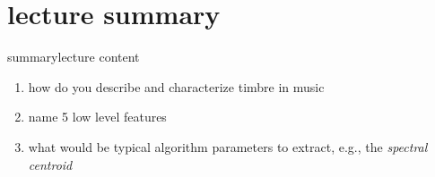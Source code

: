     \section[summary]{lecture summary}
        \begin{frame}{summary}{lecture content}
            \begin{enumerate}
                \item   how do you describe and characterize timbre in music
                \smallskip
                \item<2->   name 5 low level features
                \smallskip
                \item<3->   what would be typical algorithm parameters to extract, e.g., the \textit{spectral centroid}
            \end{enumerate}
        \end{frame}


